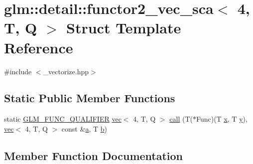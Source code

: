 \hypertarget{structglm_1_1detail_1_1functor2__vec__sca_3_014_00_01_t_00_01_q_01_4}{}\section{glm\+:\+:detail\+:\+:functor2\+\_\+vec\+\_\+sca$<$ 4, T, Q $>$ Struct Template Reference}
\label{structglm_1_1detail_1_1functor2__vec__sca_3_014_00_01_t_00_01_q_01_4}


{\ttfamily \#include $<$\+\_\+vectorize.\+hpp$>$}

\subsection*{Static Public Member Functions}
\begin{DoxyCompactItemize}
\item 
static \hyperlink{setup_8hpp_a33fdea6f91c5f834105f7415e2a64407}{G\+L\+M\+\_\+\+F\+U\+N\+C\+\_\+\+Q\+U\+A\+L\+I\+F\+I\+ER} \hyperlink{structglm_1_1vec}{vec}$<$ 4, T, Q $>$ \hyperlink{structglm_1_1detail_1_1functor2__vec__sca_3_014_00_01_t_00_01_q_01_4_aecb3a0b7b9bc4c0664db8d1b4f9a93ea}{call} (T($\ast$Func)(T \hyperlink{_s_d_l__opengl_8h_ad0e63d0edcdbd3d79554076bf309fd47}{x}, T \hyperlink{_s_d_l__opengl_8h_a1675d9d7bb68e1657ff028643b4037e3}{y}), \hyperlink{structglm_1_1vec}{vec}$<$ 4, T, Q $>$ const \&\hyperlink{_s_d_l__opengl__glext_8h_a3309789fc188587d666cda5ece79cf82}{a}, T \hyperlink{_s_d_l__opengl__glext_8h_a0f71581a41fd2264c8944126dabbd010}{b})
\end{DoxyCompactItemize}


\subsection{Member Function Documentation}
\mbox{\label{structglm_1_1detail_1_1functor2__vec__sca_3_014_00_01_t_00_01_q_01_4_aecb3a0b7b9bc4c0664db8d1b4f9a93ea}} 
